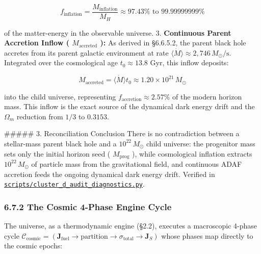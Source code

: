 \documentclass[11pt,a4paper]{article}
\theoremstyle{definition}
\theoremstyle{remark}
\begin{document}
\begin{equation}
f_{\text{inflation}} = \frac{M_{\text{inflation}}}{M_H} \approx 97.43\% \text{ to } 99.99999999\%
\end{equation}


of the matter-energy in the observable universe.
3. \textbf{Continuous Parent Accretion Inflow ( $M_{\text{accreted}}$ ):} As derived in \S 6.6.5.2, the parent black hole accretes from its parent galactic environment at rate $\langle\dot{M}\rangle \approx 2{,}746 \, M_\odot/\text{s}$. Integrated over the cosmological age $t_0 \approx 13.8$ Gyr, this inflow deposits:


\begin{equation}
M_{\text{accreted}} = \langle\dot{M}\rangle t_0 \approx 1.20 \times 10^{21} \, M_\odot
\end{equation}


into the child universe, representing $f_{\text{accretion}} \approx 2.57\%$ of the modern horizon mass. This inflow is the exact source of the dynamical dark energy drift and the $\Omega_m$ reduction from $1/3$ to $0.3153$.

\#\#\#\#\# 3. Reconciliation Conclusion
There is no contradiction between a stellar-mass parent black hole and a $10^{22} \, M_\odot$ child universe: the progenitor mass sets only the initial horizon seed ( $M_{\text{prog}}$ ), while cosmological inflation extracts $10^{22} \, M_\odot$ of particle mass from the gravitational field, and continuous ADAF accretion feeds the ongoing dynamical dark energy drift. Verified in \href{../../scripts/cluster_d_audit_diagnostics.py}{\texttt{scripts/cluster_d_audit_diagnostics.py}}.

\subsubsection{6.7.2 The Cosmic 4-Phase Engine Cycle}

The universe, as a thermodynamic engine (\S 2.2), executes a macroscopic 4-phase cycle $\mathcal{C}_{\text{cosmic}} = (\mathbf{J}_{\text{fuel}} \to \text{partition} \to \sigma_{\text{total}} \to \mathbf{J}_S)$ whose phases map directly to the cosmic epochs:
\end{document}
